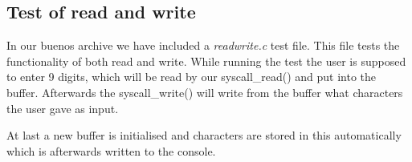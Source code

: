 \documentclass[12pt,a4paper,danish]{article}
\begin{document}
\subsection{Test of read and write}
In our buenos archive we have included a \textit{readwrite.c} test file. This file tests the functionality of both read and write.  While running the test the user is supposed to enter 9 digits, which will be read by our syscall\_read() and put into the buffer. Afterwards the syscall\_write() will write from the buffer what characters the user gave as input.

At last a new buffer is initialised and characters are stored in this automatically which is afterwards written to the console.
\end{document}
